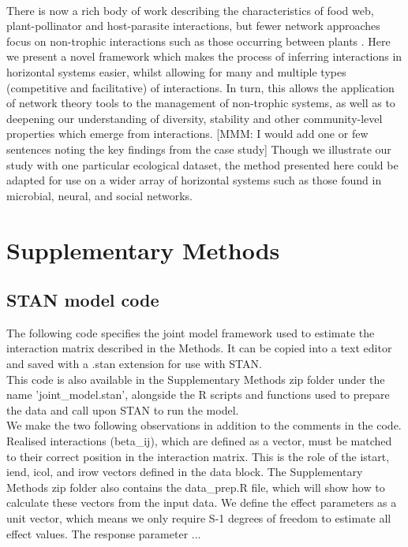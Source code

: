 \documentclass[a4,12pt]{article}
\begin{document}
    \paragraph{} 
    There is now a rich body of work describing the characteristics of food web, plant-pollinator and host-parasite interactions, but fewer network approaches focus on non-trophic interactions such as those occurring between plants \parencite{Ellison2019}. Here we present a novel framework which makes the process of inferring  interactions in horizontal systems easier, whilst allowing for many and multiple types (competitive and facilitative) of interactions. In turn, this allows the application of  network theory tools to the management of non-trophic systems, as well as to deepening our understanding of diversity, stability and other community-level properties which emerge from interactions. [MMM: I would add one or few sentences noting the key findings from the case study] Though we illustrate our study with one particular ecological dataset, the method presented here could be adapted for use on a wider array of  horizontal systems such as those found in microbial, neural, and social networks. 
   

% 
% 

\newpage

\printbibliography   

\newpage 

\section{Supplementary Methods}
\label{SI:Methods}

    \subsection{STAN model code}
    \label{SI:modelcode}
    The following code specifies the joint model framework used to estimate the interaction matrix described in the Methods. It can be copied into a text editor and saved with a .stan extension for use with STAN. \\

    This code is also available in the Supplementary Methods zip folder under the name 'joint\_model.stan', alongside the R scripts and functions used to prepare the data and call upon STAN to run the model. \\

    We make the two following observations in addition to the comments in the code.
    Realised interactions (beta\_ij), which are defined as a vector,  must be matched to their correct position in the interaction matrix. This is the role of the istart, iend, icol, and irow vectors defined in the data block. The Supplementary Methods zip folder also contains the data_prep.R file, which will show how to calculate these vectors from the input data. 
    We define the effect parameters as a unit vector, which means we only require S-1 degrees of freedom to estimate all effect values. The response parameter ...
\end{document}

